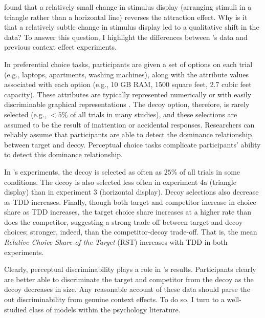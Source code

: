 \textcite{spektorWhenGoodLooks2018b} found that a relatively small change in stimulus display (arranging stimuli in a triangle rather than a horizontal line) reverses the attraction effect. Why is it that a relatively subtle change in stimulus display led to a qualitative shift in the data? To answer this question, I highlight the differences between \textcite{spektorWhenGoodLooks2018b}'s data and previous context effect experiments. 

In preferential choice tasks, participants are given a set of options on each trial (e.g., laptops, apartments, washing machines), along with the attribute values associated with each option (e.g., 10 GB RAM, 1500 square feet, 2.7 cubic feet capacity). These attributes are typically represented numerically \parencite{hayes2024attribute,banerjeeFactorsThatPromote2024} or with easily discriminable graphical representations \parencite{cataldoComparisonProcessAccount2019b}. The decoy option, therefore, is rarely selected (e.g., $<5\%$ of all trials in many studies), and these selections are assumed to be the result of inattention or accidental responses. Researchers can reliably assume that participants are able to detect the dominance relationship between target and decoy. Perceptual choice tasks complicate participants' ability to detect this dominance relationship. 

In \textcite{spektorWhenGoodLooks2018b}'s experiments, the decoy is selected as often as $25\%$ of all trials in some conditions. The decoy is also selected less often in experiment 4a (triangle display) than in experiment 3 (horizontal display). Decoy selections also decrease as TDD increases. Finally, though both target and competitor increase in choice share as TDD increases, the target choice share increases at a higher rate than does the competitor, suggesting a strong trade-off between target and decoy choices; stronger, indeed, than the competitor-decoy trade-off. That is, the mean \textit{Relative Choice Share of the Target} (RST) \parencite{berkowitschRigorouslyTestingMultialternative2014b} increases with TDD in both experiments. 

Clearly, perceptual discriminability plays a role in \textcite{spektorWhenGoodLooks2018b}'s results. Participants clearly are better able to discriminate the target and competitor from the decoy as the decoy decreases in size. Any reasonable account of these data should parse the out discriminability from genuine context effects. To do so, I turn to a well-studied class of models within the psychology literature.


